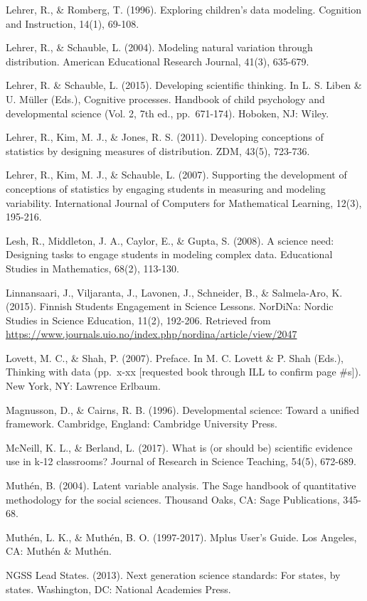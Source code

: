 \documentclass[]{msu-thesis}
\theoremstyle{definition}
\theoremstyle{definition}
\theoremstyle{definition}
\theoremstyle{remark}
\begin{document}
Lehrer, R., \& Romberg, T. (1996). Exploring children's data modeling.
Cognition and Instruction, 14(1), 69-108.

Lehrer, R., \& Schauble, L. (2004). Modeling natural variation through
distribution. American Educational Research Journal, 41(3), 635-679.

Lehrer, R. \& Schauble, L. (2015). Developing scientific thinking. In L.
S. Liben \& U. Müller (Eds.), Cognitive processes. Handbook of child
psychology and developmental science (Vol. 2, 7th ed., pp.~671-174).
Hoboken, NJ: Wiley.

Lehrer, R., Kim, M. J., \& Jones, R. S. (2011). Developing conceptions
of statistics by designing measures of distribution. ZDM, 43(5),
723-736.

Lehrer, R., Kim, M. J., \& Schauble, L. (2007). Supporting the
development of conceptions of statistics by engaging students in
measuring and modeling variability. International Journal of Computers
for Mathematical Learning, 12(3), 195-216.

Lesh, R., Middleton, J. A., Caylor, E., \& Gupta, S. (2008). A science
need: Designing tasks to engage students in modeling complex data.
Educational Studies in Mathematics, 68(2), 113-130.

Linnansaari, J., Viljaranta, J., Lavonen, J., Schneider, B., \&
Salmela-Aro, K. (2015). Finnish Students Engagement in Science Lessons.
NorDiNa: Nordic Studies in Science Education, 11(2), 192-206. Retrieved
from
\url{https://www.journals.uio.no/index.php/nordina/article/view/2047}

Lovett, M. C., \& Shah, P. (2007). Preface. In M. C. Lovett \& P. Shah
(Eds.), Thinking with data (pp.~x-xx {[}requested book through ILL to
confirm page \#s{]}). New York, NY: Lawrence Erlbaum.

Magnusson, D., \& Cairns, R. B. (1996). Developmental science: Toward a
unified framework. Cambridge, England: Cambridge University Press.

McNeill, K. L., \& Berland, L. (2017). What is (or should be) scientific
evidence use in k‐12 classrooms? Journal of Research in Science
Teaching, 54(5), 672-689.

Muthén, B. (2004). Latent variable analysis. The Sage handbook of
quantitative methodology for the social sciences. Thousand Oaks, CA:
Sage Publications, 345-68.

Muthén, L. K., \& Muthén, B. O. (1997-2017). Mplus User's Guide. Los
Angeles, CA: Muthén \& Muthén.

NGSS Lead States. (2013). Next generation science standards: For states,
by states. Washington, DC: National Academies Press.
\end{document}
